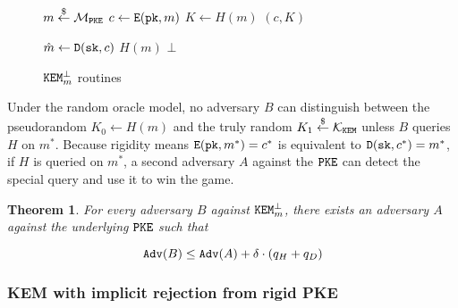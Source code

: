 \documentclass{article}
\newtheorem{theorem}{Theorem}[section]
\begin{document}
\begin{figure}[H]
    \center
    \begin{minipage}{0.49\textwidth}
        \begin{algorithm}[H]
            \caption{$\encap^\bot_m(\pk)$}\label{alg:encap-bot-m}
            \begin{algorithmic}[1]
                \State $m \stackrel{\$}{\leftarrow} \mathcal{M}_\texttt{PKE}$
                \State $c \leftarrow \texttt{E}(\texttt{pk}, m)$
                \State $K \leftarrow H(m)$
                \State \Return $(c, K)$
            \end{algorithmic}
        \end{algorithm}
    \end{minipage}
    \hfill
    \begin{minipage}{0.49\textwidth}
        \begin{algorithm}[H]
            \caption{$\decap^\bot_m(\sk, c)$}\label{alg:decap-bot-m}
            \begin{algorithmic}[1]
                \State $\hat{m} \leftarrow \texttt{D}(\texttt{sk}, c)$
                    \State \Return $H(m)$
                \EndIf
                \State \Return $\bot$
            \end{algorithmic}
        \end{algorithm}
    \end{minipage}
    \caption{$\texttt{KEM}^\bot_m$ routines}\label{fig:u-bot-m-routines}
\end{figure}

Under the random oracle model, no adversary $B$ can distinguish between the pseudorandom $K_0 \leftarrow H(m)$ and the truly random $K_1 \stackrel{\$}{\leftarrow} \mathcal{K}_\texttt{KEM}$ unless $B$ queries $H$ on $m^\ast$.  Because rigidity means $\texttt{E}(\texttt{pk}, m^\ast) = c^\ast$ is equivalent to $\texttt{D}(\texttt{sk}, c^\ast) = m^\ast$, if $H$ is queried on $m^\ast$, a second adversary $A$ against the $\texttt{PKE}$ can detect the special query and use it to win the  game.

\begin{theorem}
    For every  adversary $B$ against $\texttt{KEM}^\bot_m$, there exists an  adversary $A$ against the underlying $\texttt{PKE}$ such that

    \begin{equation*}
        \texttt{Adv}(B) \leq \texttt{Adv}(A) + \delta \cdot (q_H + q_D)
    \end{equation*}
\end{theorem}

\subsubsection{KEM with implicit rejection from rigid PKE}



\end{document}
